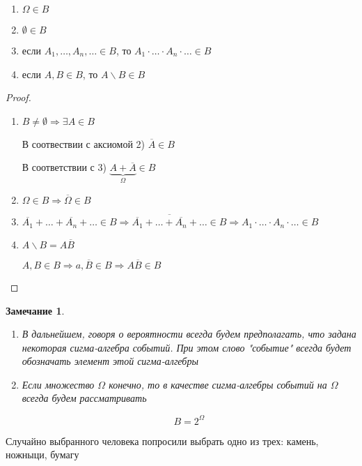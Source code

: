 \documentclass[a4paper, 14pt]{report}
\newtheorem{note}{Замечание}[chapter]
\begin{document}
\begin{enumerate}
    \item $\Omega \in B$
    \item $\emptyset \in B$
    \item если $A_1, \dots, A_n, \dots \in B$, то $A_1 \cdot \dots \cdot A_n \cdot \dots \in B$
    \item если $A,B \in B$, то $A \backslash B \in B$
\end{enumerate}

\begin{proof}
    \begin{enumerate}
        \item $B \ne \emptyset \Rightarrow \exists A \in B$

            В соотвествии с аксиомой 2) $\overline{A} \in B$

            В соответствии с 3) $\underbrace{A + \overline{A}}_{\Omega} \in B$

        \item $\Omega \in B \Rightarrow \overline{\Omega} \in B$

        \item $\overline{A_1} + \dots + \overline{A_n} + \dots \in B \Rightarrow \overline{\overline{A_1} + \dots + \overline{A_n} + \dots} \in B \Rightarrow A_1 \cdot \dots \cdot A_n \cdot \dots \in B$

        \item $A \backslash B = A \overline{B}$

            $A, B \in B \Rightarrow a, \overline{B} \in B \Rightarrow A \overline{B} \in B$
    \end{enumerate}
\end{proof}

\begin{note}
    \begin{enumerate}
        \item В дальнейшем, говоря о вероятности всегда будем предполагать, что задана некоторая сигма-алгебра событий. При этом слово "событие" всегда будет обозначать элемент этой сигма-алгебры
        \item Если множество $\Omega$ конечно, то в качестве сигма-алгебры событий на $\Omega$ всегда будем рассматривать

            $$
            B = 2^\Omega
            $$
    \end{enumerate}
\end{note}

Случайно выбранного человека попросили выбрать одно из трех: камень, ножныци, бумагу
\end{document}

